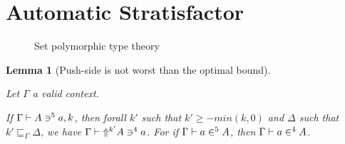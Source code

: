 \documentclass[preprint
              , authoryear
              , onecolumn
              ]{sigplanconf}
\newtheorem{lemma}{Lemma}
\newcommand{\greenb}[3]{\fcolorbox{green}{white}{$#1$}_{\textcolor{green}{#2}}^{\textcolor{green}{#3}}}
\newcommand{\sublift}[3]{#2 \sqsubseteq_{#1} #3}
\begin{document}
\section{Automatic Stratisfactor}


\begin{figure}

\begin{center}

\end{center}

\caption{Set polymorphic type theory}

\end{figure}






\begin{lemma}[Push-side is not worst than the optimal bound]
\label{lemma:push-k-good-enough}

Let $\Gamma$ a valid context.

If \xspace$\Gamma \vdash \pushN{a}{5}{A}, k$, then forall $k'$ such
that $k' \geq -min(k,0)$ and $\Delta$ such that
$\sublift{\Gamma}{k'}{\Delta}$, we have $\Gamma \vdash
\pushN{a}{4}{\Up{k'}{A}}$. For if $\Gamma \vdash \pullN{a}{5}{A}$,
then $\Gamma \vdash \pullN{a}{4}{A}$.

\end{lemma}

\end{document}
